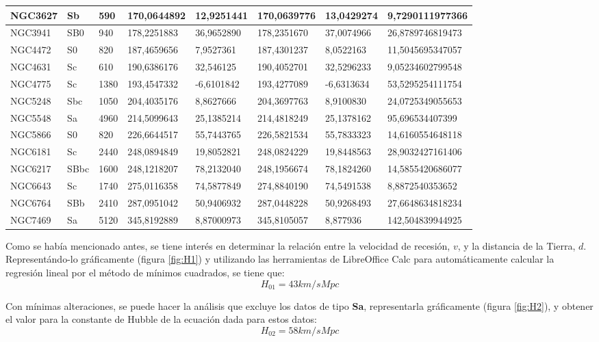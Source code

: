 \documentclass[a4paper,12pt]{article}
\begin{document}
\begin{table}[h!]
\begin{tabular}{|l|l|l|l|l|l|l|l|}
        NGC3627 & Sb & 590 & 170,0644892 & 12,9251441 & 170,0639776 & 13,0429274 & 9,7290111977366 \\ \hline
        NGC3941 & SB0 & 940 & 178,2251883 & 36,9652890 & 178,2351670 & 37,0074966 & 26,8789746819473 \\ \hline
        NGC4472 & S0 & 820 & 187,4659656 & 7,9527361 & 187,4301237 & 8,0522163 & 11,5045695347057 \\ \hline
        NGC4631 & Sc & 610 & 190,6386176 & 32,546125 & 190,4052701 & 32,5296233 & 9,05234602799548 \\ \hline
        NGC4775 & Sc & 1380 & 193,4547332 & -6,6101842 & 193,4277089 & -6,6313634 & 53,5295254111754 \\ \hline
        NGC5248 & Sbc & 1050 & 204,4035176 & 8,8627666 & 204,3697763 & 8,9100830 & 24,0725349055653 \\ \hline
        NGC5548 & Sa & 4960 & 214,5099643 & 25,1385214 & 214,4818249 & 25,1378162 & 95,696534407399 \\ \hline
        NGC5866 & S0 & 820 & 226,6644517 & 55,7443765 & 226,5821534 & 55,7833323 & 14,6160554648118 \\ \hline
        NGC6181 & Sc & 2440 & 248,0894849 & 19,8052821 & 248,0824229 & 19,8448563 & 28,9032427161406 \\ \hline
        NGC6217 & SBbc & 1600 & 248,1218207 & 78,2132040 & 248,1956674 & 78,1824260 & 14,5855420686077 \\ \hline
        NGC6643 & Sc & 1740 & 275,0116358 & 74,5877849 & 274,8840190 & 74,5491538 & 8,8872540353652 \\ \hline
        NGC6764 & SBb & 2410 & 287,0951042 & 50,9406932 & 287,0448228 & 50,9268493 & 27,6648634818234 \\ \hline
        NGC7469 & Sa & 5120 & 345,8192889 & 8,87000973 & 345,8105057 & 8,877936 & 142,504839944925 \\ \hline
    \end{tabular}
\end{table}

Como se había mencionado antes, se tiene interés en determinar la relación entre la velocidad de recesión, $v$, y la
distancia de la Tierra, $d$. Representándo-lo gráficamente (figura \ref{fig:H1}) y utilizando las herramientas de LibreOffice Calc para
automáticamente calcular la regresión lineal por el método de mínimos cuadrados, se tiene que:
$$H_{01} = 43 km/s Mpc$$

Con mínimas alteraciones, se puede hacer la análisis que excluye los datos de tipo \textbf{Sa}, 
representarla gráficamente (figura \ref{fig:H2}), y obtener el valor para la constante de Hubble de la ecuación dada para estos datos:
$$H_{02} = 58 km/sMpc$$  
\end{document}
